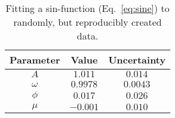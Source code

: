 \begin{table}
\centering
\caption{Fitting a sin-function (Eq.~\ref{eq:sine}) to randomly, but reproducibly created data.}
\label{tab:sin_fit_x_y}
\begin{tabular}{ccc}
\hline\hline
Parameter & Value & Uncertainty \\
\hline
$A$ & $1.011$ & $0.014$ \\
$\omega$ & $0.9978$ & $0.0043$ \\
$\phi$ & $0.017$ & $0.026$ \\
$\mu$ & $-0.001$ & $0.010$ \\
\hline\hline
\end{tabular}
\end{table}